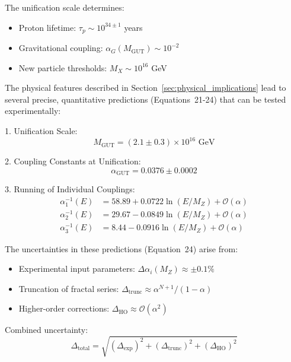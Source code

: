 \documentclass{article}
\begin{document}
\begin{corollary}
The unification scale determines:
\begin{itemize}
\item Proton lifetime: $\tau_p \sim 10^{34\pm 1}$ years
\item Gravitational coupling: $\alpha_G(M_{\text{GUT}}) \sim 10^{-2}$
\item New particle thresholds: $M_X \sim 10^{16}$ GeV
\end{itemize}
\end{corollary}

The physical features described in Section~\ref{sec:physical_implications} lead to several precise, quantitative predictions (Equations~21-24) that can be tested experimentally:

1. Unification Scale:
   \begin{equation}
   M_{\text{GUT}} = (2.1 \pm 0.3) \times 10^{16} \text{ GeV}
   \end{equation}

2. Coupling Constants at Unification:
   \begin{equation}
   \alpha_{\text{GUT}} = 0.0376 \pm 0.0002
   \end{equation}

3. Running of Individual Couplings:
   \begin{align}
   \alpha_1^{-1}(E) &= 58.89 + 0.0722\ln(E/M_Z) + \mathcal{O}(\alpha) \\
   \alpha_2^{-1}(E) &= 29.67 - 0.0849\ln(E/M_Z) + \mathcal{O}(\alpha) \\
   \alpha_3^{-1}(E) &= 8.44 - 0.0916\ln(E/M_Z) + \mathcal{O}(\alpha)
   \end{align}

The uncertainties in these predictions (Equation~24) arise from:

\begin{itemize}
\item Experimental input parameters: $\Delta\alpha_i(M_Z) \approx \pm 0.1\%$
\item Truncation of fractal series: $\Delta_{\text{trunc}} \approx \alpha^{N+1}/(1-\alpha)$
\item Higher-order corrections: $\Delta_{\text{HO}} \approx \mathcal{O}(\alpha^2)$
\end{itemize}

Combined uncertainty:
\begin{equation}
\Delta_{\text{total}} = \sqrt{(\Delta_{\text{exp}})^2 + (\Delta_{\text{trunc}})^2 + (\Delta_{\text{HO}})^2}
\end{equation}
\end{document}
